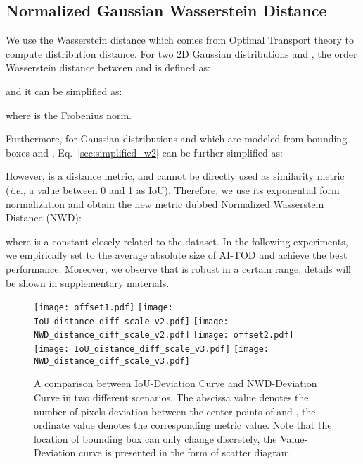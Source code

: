 \documentclass{article}
\newcommand{\fixedvskip}{-3mm}
\newcommand{\ie}{\textit{i.e.}}
\begin{document}
\subsection{Normalized Gaussian Wasserstein Distance}
\label{sec::nwd_definition}

We use the Wasserstein distance which comes from Optimal Transport theory to compute distribution distance. For two 2D Gaussian distributions  and , the  order Wasserstein distance between  and  is defined as:


and it can be simplified as:


where  is the Frobenius norm. 

Furthermore, for Gaussian distributions  and  which are modeled from bounding boxes  and , Eq.~\ref{sec:simplified_w2} can be further simplified as:


However,  is a distance metric, and cannot be directly used as similarity metric (\ie, a value between 0 and 1 as IoU). Therefore, we use its exponential form normalization and obtain the new metric dubbed Normalized Wasserstein Distance (NWD): 


where  is a constant closely related to the dataset. In the following experiments, we empirically set  to the average absolute size of AI-TOD and achieve the best performance. Moreover, we observe that  is robust in a certain range, details will be shown in supplementary materials.

 \begin{figure}[t]
    \centering
    \subfigure
    {
        \label{fig:offset1}
        \texttt{[image: offset1.pdf]}
    }
    \subfigure
    {
        \label{fig:iou1}
        \texttt{[image: IoU\_distance\_diff\_scale\_v2.pdf]}
    }
    \subfigure
    {
        \label{fig:nwd1}
        \texttt{[image: NWD\_distance\_diff\_scale\_v2.pdf]}
    }
    \subfigure
    {
        \label{fig:offset2}
        \texttt{[image: offset2.pdf]}
    }
    \subfigure
    {
        \label{fig:iou2}
        \texttt{[image: IoU\_distance\_diff\_scale\_v3.pdf]}
    }
    \subfigure
    {
        \label{fig:nwd2}
        \texttt{[image: NWD\_distance\_diff\_scale\_v3.pdf]}
    }
    \vspace{\fixedvskip}
    \caption{A comparison between IoU-Deviation Curve and NWD-Deviation Curve in two different scenarios. The abscissa value denotes the number of pixels deviation between the center points of  and , the ordinate value denotes the corresponding metric value. Note that the location of bounding box can only change discretely, the Value-Deviation curve is presented in the form of scatter diagram. }
    \label{fig::deviation_analysis}
    \vspace{\fixedvskip}
\end{figure}
\end{document}
